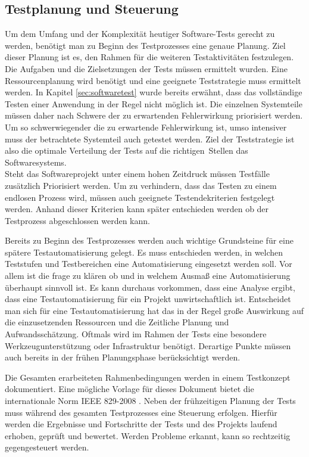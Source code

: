 \subsection{Testplanung und Steuerung}
\label{subsec:testplanung_und_steuerung}
Um dem Umfang und der Komplexität heutiger Software-Tests gerecht zu werden, benötigt man zu Beginn des Testprozesses eine genaue Planung.
Ziel dieser Planung ist es, den Rahmen für die weiteren Testaktivitäten festzulegen. Die Aufgaben und die Zielsetzungen der Tests müssen ermittelt wurden. Eine Ressourcenplanung wird benötigt und eine geeignete Teststrategie muss ermittelt werden. In Kapitel \ref{sec:softwaretest} wurde bereits erwähnt, dass das vollständige Testen einer Anwendung in der Regel nicht möglich ist. Die einzelnen Systemteile müssen daher nach Schwere der zu erwartenden Fehlerwirkung priorisiert werden. Um so schwerwiegender die zu erwartende Fehlerwirkung ist, umso intensiver muss der betrachtete Systemteil auch getestet werden. Ziel der Teststrategie ist also \glqq die optimale Verteilung der Tests auf die \frqq richtigen\flqq\ Stellen das Softwaresystems.\grqq\ \cite[S.21]{spillner_basiswissen_2007} \\ Steht das Softwareprojekt unter einem hohen Zeitdruck müssen Testfälle zusätzlich Priorisiert werden.
Um zu verhindern, dass das Testen zu einem endlosen Prozess wird, müssen auch geeignete Testendekriterien festgelegt werden. Anhand dieser Kriterien kann später entschieden werden ob der Testprozess abgeschlossen werden kann.

Bereits zu Beginn des Testprozesses werden auch wichtige Grundsteine für eine spätere Testautomatisierung gelegt. Es muss entschieden werden, in welchen Teststufen und Testbereichen eine Automatisierung eingesetzt werden soll. Vor allem ist die frage zu klären ob und in welchem Ausmaß eine Automatisierung überhaupt sinnvoll ist. Es kann durchaus vorkommen, dass eine Analyse ergibt, dass eine Testautomatisierung für ein Projekt unwirtschaftlich ist.
Entscheidet man sich für eine Testautomatisierung hat das in der Regel große Auswirkung auf die einzusetzenden Ressourcen und die Zeitliche Planung und Aufwandsschätzung.
Oftmals wird im Rahmen der Tests eine besondere Werkzeugunterstützung oder Infrastruktur benötigt. Derartige Punkte müssen auch bereits in der frühen Planungsphase berücksichtigt werden.

Die Gesamten erarbeiteten Rahmenbedingungen werden in einem Testkonzept dokumentiert.
Eine mögliche Vorlage für dieses Dokument bietet die internationale Norm IEEE 829-2008 \cite{ieee_ieee_2008}.
Neben der frühzeitigen Planung der Tests muss während des gesamten Testprozesses eine Steuerung erfolgen.
Hierfür werden die Ergebnisse und Fortschritte der Tests und des Projekts laufend erhoben, geprüft und bewertet. Werden Probleme erkannt, kann so rechtzeitig gegengesteuert werden. 

